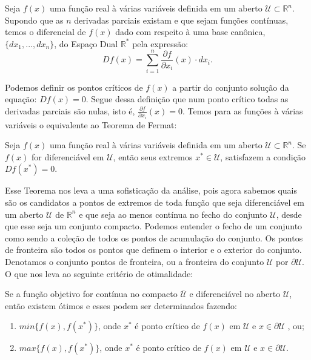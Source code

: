 \begin{definition}[O Diferencial de $f(x)$]
  Seja $f(x)$ uma função real à várias variáveis definida em um aberto $\mathcal{U} \subset \mathbb{R}^n$. Supondo que as $n$ derivadas parciais existam e que sejam funções contínuas, temos o diferencial de $f(x)$ dado com respeito à uma base canônica,$\{dx_1, ..., dx_n\}$, do Espaço Dual $\mathbb{R}^*$ pela expressão:
  $$Df(x) = \sum_{i=1}^{n} \frac{\partial f}{\partial x_i}(x)  \cdot dx_i .$$
\end{definition}

\par Podemos definir os pontos críticos de $f(x)$ a partir do conjunto solução da equação: $Df(x) = 0$. Segue dessa definição que num ponto crítico todas as derivadas parciais são nulas, isto é, $\frac{\partial f}{\partial x_i}(x) = 0$. Temos para as funções à várias variáveis o equivalente ao Teorema de Fermat:


\begin{theorem}
  Seja $f(x)$ uma função real à várias variáveis definida em um aberto $\mathcal{U} \subset \mathbb{R}^n$. Se $f(x)$ for diferenciável em $\mathcal{U}$, então seus extremos $x^{*} \in \mathcal{U}$, satisfazem a condição $Df(x^*) = 0$. 
\end{theorem}

\par Esse Teorema nos leva a uma sofisticação da análise, pois agora sabemos quais são os candidatos a pontos de extremos de toda função que seja diferenciável em um aberto $\mathcal{U}$ de $\mathbb{R}^n$ e que seja ao menos contínua no fecho do conjunto $\mathcal{U}$, desde que esse seja um conjunto compacto. Podemos entender o fecho de um conjunto como sendo a coleção de todos os pontos de acumulação do conjunto. Os pontos de fronteira são todos os pontos que definem o interior e o exterior do conjunto. Denotamos o conjunto pontos de fronteira, ou a fronteira do conjunto $\mathcal{U}$ por $\partial \mathcal{U}$. O que nos leva ao seguinte critério de otimalidade:

\begin{theorem}
  Se a função objetivo for contínua no compacto $\mathcal{\bar{U}}$ e diferenciável no aberto $\mathcal{U}$, então existem ótimos e esses podem ser determinados fazendo:
  \begin{enumerate}
  \item $min\{f(x), f(x^{*})\}$, onde $x^{*}$ é ponto crítico de $f(x)$ em $\mathcal{U}$ e $x \in \partial \mathcal{U}$ , ou;
  \item $max\{f(x), f(x^{*})\}$, onde $x^{*}$ é ponto crítico de $f(x)$ em $\mathcal{U}$ e $x \in \partial \mathcal{U}$.
  \end{enumerate}
\end{theorem}

